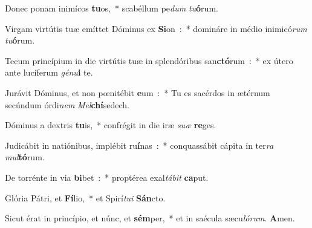 \item Donec ponam inimícos \textbf{tu}\-os,~* scabéllum pe\emph{dum} \emph{tu}\-\textbf{ó}\-rum.
\item Virgam virtútis tuæ emíttet Dó\-minus ex \textbf{Si}\-on~:~* domináre in médio inimicó\emph{rum} \emph{tu}\-\textbf{ó}\-rum.
\item Tecum princípium in die virtútis tuæ in splendóribus san\textbf{ctó}\-rum~:~* ex útero ante lucíferum \emph{gé}\-\emph{nu}\-\textbf{i} te.
\item Jurávit Dóminus, et non pœnitébit \textbf{e}\-um~:~* Tu es sacérdos in ætérnum secúndum órdi\emph{nem} \emph{Mel}\-\textbf{chí}\-sedech.
\item Dóminus a dextris \textbf{tu}\-is,~* confrégit in die iræ \emph{su}\-\emph{æ} \textbf{re}\-ges.
\item Judicábit in natiónibus, implébit ru\textbf{í}\-nas~:~* conquassábit cápita in ter\emph{ra} \emph{mul}\-\textbf{tó}\-rum.
\item De torrénte in via \textbf{bi}\-bet~:~* proptérea exal\emph{tá}\-\emph{bit} \textbf{ca}\-put.
\item Glória Pátri, et \textbf{Fí}\-lio,~* et Spirí\emph{tu}\-\emph{i} \textbf{Sán}\-cto.
\item Sicut érat in princípio, et núnc, et \textbf{sém}\-per,~* et in saécula sæcu\emph{ló}\-\emph{rum}. \textbf{A}\-men.
